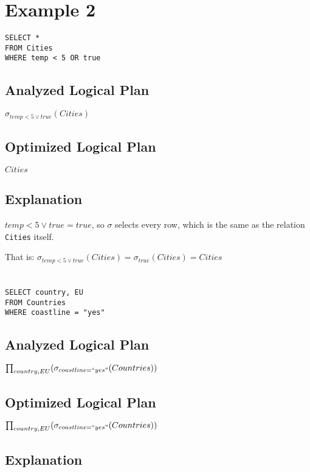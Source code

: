 \documentclass[12pt]{article}
\begin{document}
\newpage

\section*{Example 2}
\begin{verbatim}
SELECT *
FROM Cities
WHERE temp < 5 OR true
\end{verbatim}

\subsection*{Analyzed Logical Plan}
$\sigma_{temp < 5 \vee true}(Cities)$

\subsection*{Optimized Logical Plan}
$Cities$

\subsection*{Explanation}
$temp < 5 \vee true = true$, so $\sigma$ selects every row,
which is the same as the relation \verb|Cities| itself.

That is:
$\sigma_{temp < 5 \vee true}(Cities) = \sigma_{true}(Cities) = Cities$

\newpage

\section{}
\begin{verbatim}
SELECT country, EU
FROM Countries
WHERE coastline = "yes"
\end{verbatim}

\subsection*{Analyzed Logical Plan}

$\prod_{country, EU}(\sigma_{coastline = ``yes"}(Countries))$

\subsection*{Optimized Logical Plan}

$\prod_{country, EU}(\sigma_{coastline = ``yes"}(Countries))$

\subsection*{Explanation}
\end{document}
